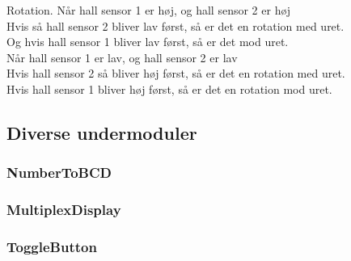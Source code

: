 Rotation.
Når hall sensor 1 er høj, og hall sensor 2 er høj\\
Hvis så hall sensor 2 bliver lav først, så er det en rotation med uret.\\
Og hvis hall sensor 1 bliver lav først, så er det mod uret.\\

Når hall sensor 1 er lav, og hall sensor 2 er lav\\
Hvis hall sensor 2 så bliver høj først, så er det en rotation med uret.\\
Hvis hall sensor 1 bliver høj først, så er det en rotation mod uret.\\

\subsection{Diverse undermoduler}

\subsubsection{NumberToBCD}

\subsubsection{MultiplexDisplay}

\subsubsection{ToggleButton}

